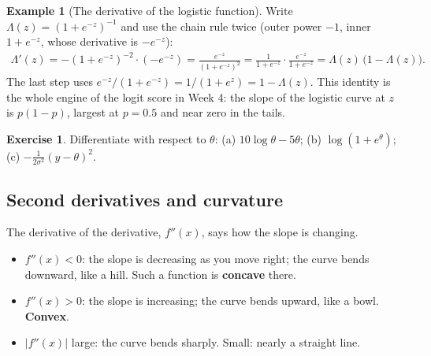 \documentclass[11pt]{article}
\theoremstyle{definition}
\newtheorem{example}{Example}[section]
\newtheorem{exercise}{Exercise}
\begin{document}
\begin{example}[The derivative of the logistic function]
\label{ex:logistic-deriv}
Write $\Lambda(z) = (1+e^{-z})^{-1}$ and use the chain rule twice (outer
power $-1$, inner $1+e^{-z}$, whose derivative is $-e^{-z}$):
\begin{align*}
  \Lambda'(z) = -(1+e^{-z})^{-2}\cdot(-e^{-z}) = \frac{e^{-z}}{(1+e^{-z})^{2}}
  = \frac{1}{1+e^{-z}}\cdot\frac{e^{-z}}{1+e^{-z}} = \Lambda(z)\,\big(1-\Lambda(z)\big).
\end{align*}
The last step uses $e^{-z}/(1+e^{-z}) = 1/(1+e^{z}) = 1 - \Lambda(z)$.
This identity is the whole engine of the logit score in Week 4: the slope of
the logistic curve at $z$ is $p(1-p)$, largest at $p = 0.5$ and near zero
in the tails.
\end{example}

\begin{exercise}
Differentiate with respect to $\theta$: (a) $10\log\theta - 5\theta$;
(b) $\log(1+e^{\theta})$; (c) $-\tfrac{1}{2\sigma^2}(y - \theta)^2$.
\end{exercise}

\subsection{Second derivatives and curvature}
\label{sec:second}

The derivative of the derivative, $f''(x)$, says how the slope is changing.
\begin{itemize}
  \item $f''(x) < 0$: the slope is decreasing as you move right; the curve
        bends downward, like a hill. Such a function is \textbf{concave}
        there.
  \item $f''(x) > 0$: the slope is increasing; the curve bends upward, like
        a bowl. \textbf{Convex}.
  \item $|f''(x)|$ large: the curve bends sharply. Small: nearly a straight
        line.
\end{itemize}
\end{document}
